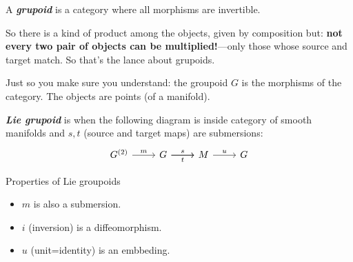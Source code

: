 \begin{defn}\leavevmode
A \textit{\textbf{grupoid}} is a category where all morphisms are invertible.
\end{defn}

So there is a kind of product among the objects, given by composition but: \textbf{not every two pair of objects can be multiplied!}---only those whose source and target match. So that's the lance about grupoids.

Just so you make sure you understand: the groupoid \(G\) is the morphisms of the category. The objects are points (of a manifold).

\begin{defn}\leavevmode
\textit{\textbf{Lie grupoid}} is when the following diagram is inside category of smooth manifolds and \(s,t\) (source and target maps) are submersions:
\[\begin{tikzcd}
	G^{(2)}\arrow[r,"m"]& G \arrow[ r,"s"]\arrow[r,"t",swap]& M \arrow[r,"u"]& G
\end{tikzcd}\]
\end{defn}

\begin{thing6}{Properties of Lie groupoids}\leavevmode
\begin{itemize}
\item \(m\) is also a submersion.
\item \(i\) (inversion) is a diffeomorphism.
\item  \(u\) (unit=identity) is an embbeding.
\end{itemize}
\end{thing6}



